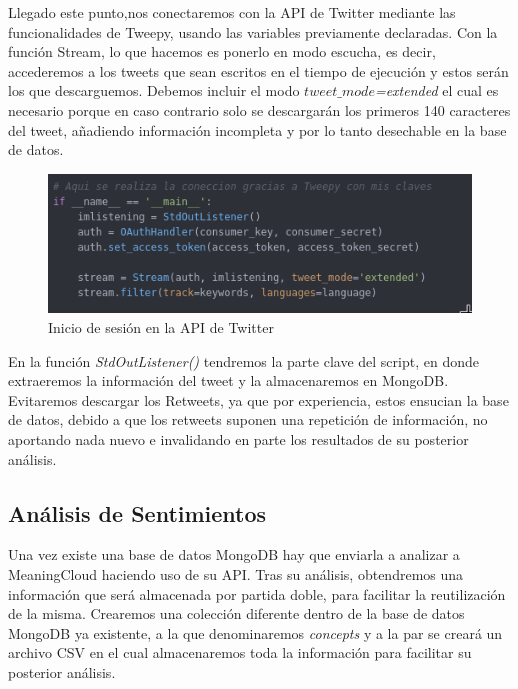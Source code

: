 Llegado este punto,nos conectaremos con la API de Twitter mediante las funcionalidades de Tweepy, usando las variables previamente declaradas. Con la función Stream, lo que hacemos es ponerlo en modo escucha, es decir, accederemos a los tweets que sean escritos en el tiempo de ejecución y estos serán los que descarguemos. Debemos incluir el modo \textit{$tweet\_mode$=extended} el cual es necesario porque en caso contrario solo se descargarán los primeros 140 caracteres del tweet, añadiendo información incompleta y por lo tanto desechable en la base de datos. 

\begin{figure}[h]
	\centering
	\includegraphics[scale=.5]{imagenes/inicio-sesion-ladron.png}
	\caption{Inicio de sesión en la API de Twitter}
	\label{fig:inicio-sesion-ladron}
\end{figure}


En la función \textit{StdOutListener()} tendremos la parte clave del script, en donde extraeremos la información del tweet y la almacenaremos en MongoDB. Evitaremos descargar los Retweets, ya que por experiencia, estos ensucian la base de datos, debido a que los retweets suponen una repetición de información, no aportando nada nuevo e invalidando en parte los resultados de su posterior análisis. 

















\subsection{Análisis de Sentimientos}


Una vez existe una base de datos MongoDB hay que enviarla a analizar a MeaningCloud haciendo uso de su API. Tras su análisis, obtendremos una información que será almacenada por partida doble, para facilitar la reutilización de la misma. Crearemos una colección diferente dentro de la base de datos MongoDB ya existente, a la que denominaremos \textit{concepts} y a la par se creará un archivo CSV en el cual almacenaremos toda la información para facilitar su posterior análisis. 


